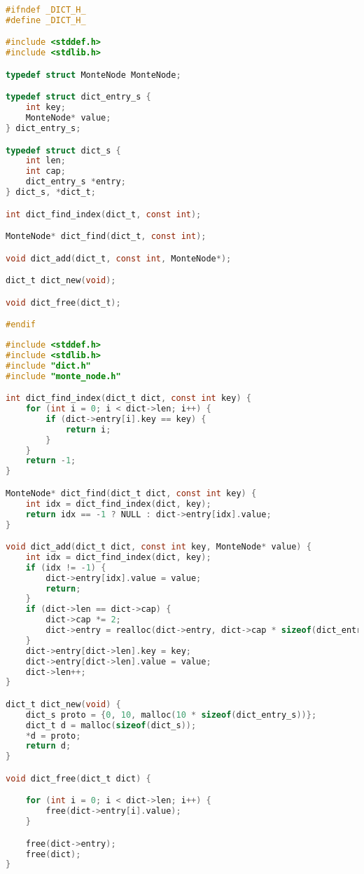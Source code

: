\documentclass[fancychapters]{report}   	%
\begin{document}
\begin{lstlisting}[language=C,caption={dict.h}]
#ifndef _DICT_H_
#define _DICT_H_

#include <stddef.h>
#include <stdlib.h>

typedef struct MonteNode MonteNode;

typedef struct dict_entry_s {
    int key;
    MonteNode* value;
} dict_entry_s;

typedef struct dict_s {
    int len;
    int cap;
    dict_entry_s *entry;
} dict_s, *dict_t;

int dict_find_index(dict_t, const int);

MonteNode* dict_find(dict_t, const int);

void dict_add(dict_t, const int, MonteNode*);

dict_t dict_new(void);

void dict_free(dict_t);

#endif
\end{lstlisting}
\begin{lstlisting}[language=C,caption={dict.c}]
#include <stddef.h>
#include <stdlib.h>
#include "dict.h"
#include "monte_node.h"

int dict_find_index(dict_t dict, const int key) {
    for (int i = 0; i < dict->len; i++) {
        if (dict->entry[i].key == key) {
            return i;
        }
    }
    return -1;
}

MonteNode* dict_find(dict_t dict, const int key) {
    int idx = dict_find_index(dict, key);
    return idx == -1 ? NULL : dict->entry[idx].value;
}

void dict_add(dict_t dict, const int key, MonteNode* value) {
    int idx = dict_find_index(dict, key);
    if (idx != -1) {
        dict->entry[idx].value = value;
        return;
    }
    if (dict->len == dict->cap) {
        dict->cap *= 2;
        dict->entry = realloc(dict->entry, dict->cap * sizeof(dict_entry_s));
    }
    dict->entry[dict->len].key = key;
    dict->entry[dict->len].value = value;
    dict->len++;
}

dict_t dict_new(void) {
    dict_s proto = {0, 10, malloc(10 * sizeof(dict_entry_s))};
    dict_t d = malloc(sizeof(dict_s));
    *d = proto;
    return d;
}

void dict_free(dict_t dict) {

    for (int i = 0; i < dict->len; i++) {
        free(dict->entry[i].value);
    }

    free(dict->entry);
    free(dict);
}
\end{lstlisting}
\end{document}
